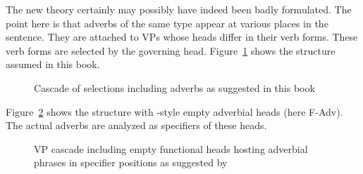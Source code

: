 \eanoraggedright
The new theory certainly may possibly have indeed been badly formulated.
\z
\largerpage
The point here is that adverbs of the same type appear at various places in the sentence. They are
attached to VPs whose heads differ in their verb forms. These verb forms are selected by the governing
head. Figure~\ref{fig-verbal-selection} shows the structure assumed in this book.
\begin{figure}
\caption{Cascade of selections including adverbs as suggested in this book}\label{fig-verbal-selection}
\end{figure}
Figure~\ref{fig-Cinque-AdvP-VP-selection} shows the structure with \citeauthor{Cinque99a-u}-style
empty adverbial heads (here F-Adv). The actual adverbs are analyzed as specifiers of these heads.
\begin{figure}[htb]
\caption{VP cascade including empty functional heads hosting adverbial phrases in specifier positions
  as suggested by \citet{Cinque99a-u}}\label{fig-Cinque-AdvP-VP-selection}
\end{figure}

